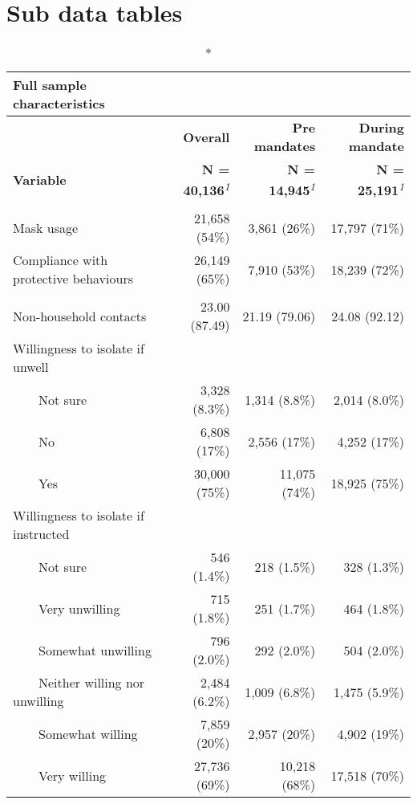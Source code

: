 \documentclass[
]{article}
\begin{document}
\hypertarget{sub-data-tables}{%
\section{Sub data tables}\label{sub-data-tables}}

\setlength{\LTpost}{0mm}
\begin{longtable}{lrrr}
\caption*{
{\large Full sample characteristics}
} \\ 
\toprule
 & \textbf{Overall} & \textbf{Pre mandates} & \textbf{During mandate} \\ 
\cmidrule(lr){2-2} \cmidrule(lr){3-3} \cmidrule(lr){4-4}
\textbf{Variable} & \textbf{N = 40,136}\textsuperscript{\textit{1}} & \textbf{N = 14,945}\textsuperscript{\textit{1}} & \textbf{N = 25,191}\textsuperscript{\textit{1}} \\ 
\midrule\addlinespace[2.5pt]
\multicolumn{4}{l}{Response variables} \\ 
\midrule\addlinespace[2.5pt]
Mask usage & 21,658 (54\%) & 3,861 (26\%) & 17,797 (71\%) \\ 
Compliance with protective behaviours & 26,149 (65\%) & 7,910 (53\%) & 18,239 (72\%) \\ 
\midrule\addlinespace[2.5pt]
\multicolumn{4}{l}{Self protective behaviours} \\ 
\midrule\addlinespace[2.5pt]
Non-household contacts & 23.00 (87.49) & 21.19 (79.06) & 24.08 (92.12) \\ 
Willingness to isolate if unwell &  &  &  \\ 
    Not sure & 3,328 (8.3\%) & 1,314 (8.8\%) & 2,014 (8.0\%) \\ 
    No & 6,808 (17\%) & 2,556 (17\%) & 4,252 (17\%) \\ 
    Yes & 30,000 (75\%) & 11,075 (74\%) & 18,925 (75\%) \\ 
Willingness to isolate if instructed &  &  &  \\ 
    Not sure & 546 (1.4\%) & 218 (1.5\%) & 328 (1.3\%) \\ 
    Very unwilling & 715 (1.8\%) & 251 (1.7\%) & 464 (1.8\%) \\ 
    Somewhat unwilling & 796 (2.0\%) & 292 (2.0\%) & 504 (2.0\%) \\ 
    Neither willing nor unwilling & 2,484 (6.2\%) & 1,009 (6.8\%) & 1,475 (5.9\%) \\ 
    Somewhat willing & 7,859 (20\%) & 2,957 (20\%) & 4,902 (19\%) \\ 
    Very willing & 27,736 (69\%) & 10,218 (68\%) & 17,518 (70\%) \\ 

\end{longtable}
\end{document}
